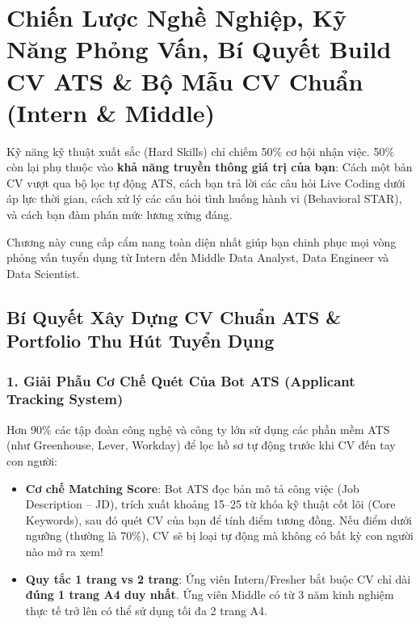 \chapter{Chiến Lược Nghề Nghiệp, Kỹ Năng Phỏng Vấn, Bí Quyết Build CV ATS \& Bộ Mẫu CV Chuẩn (Intern \& Middle)}

\begin{lythuyetbox}
Kỹ năng kỹ thuật xuất sắc (Hard Skills) chỉ chiếm 50\% cơ hội nhận việc. 50\% còn lại phụ thuộc vào \textbf{khả năng truyền thông giá trị của bạn}: Cách một bản CV vượt qua bộ lọc tự động ATS, cách bạn trả lời các câu hỏi Live Coding dưới áp lực thời gian, cách xử lý các câu hỏi tình huống hành vi (Behavioral STAR), và cách bạn đàm phán mức lương xứng đáng.

Chương này cung cấp cẩm nang toàn diện nhất giúp bạn chinh phục mọi vòng phỏng vấn tuyển dụng từ Intern đến Middle Data Analyst, Data Engineer và Data Scientist.
\end{lythuyetbox}

\section{Bí Quyết Xây Dựng CV Chuẩn ATS \& Portfolio Thu Hút Tuyển Dụng}

\subsection{1. Giải Phẫu Cơ Chế Quét Của Bot ATS (Applicant Tracking System)}
Hơn 90\% các tập đoàn công nghệ và công ty lớn sử dụng các phần mềm ATS (như Greenhouse, Lever, Workday) để lọc hồ sơ tự động trước khi CV đến tay con người:
\begin{itemize}
    \item \textbf{Cơ chế Matching Score}: Bot ATS đọc bản mô tả công việc (Job Description -- JD), trích xuất khoảng 15--25 từ khóa kỹ thuật cốt lõi (Core Keywords), sau đó quét CV của bạn để tính điểm tương đồng. Nếu điểm dưới ngưỡng (thường là 70\%), CV sẽ bị loại tự động mà không có bất kỳ con người nào mở ra xem!
    \item \textbf{Quy tắc 1 trang vs 2 trang}: Ứng viên Intern/Fresher bắt buộc CV chỉ dài \textbf{đúng 1 trang A4 duy nhất}. Ứng viên Middle có từ 3 năm kinh nghiệm thực tế trở lên có thể sử dụng tối đa 2 trang A4.
\end{itemize}

